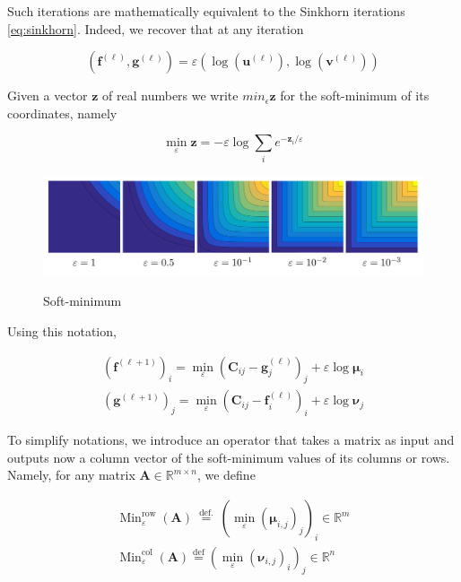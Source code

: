 Such iterations are mathematically equivalent to the Sinkhorn iterations \ref{eq:sinkhorn}. Indeed, we recover that at
any iteration

\begin{equation}
  \left(\mathbf{f}^{(\ell)}, \mathbf{g}^{(\ell)}\right)=\varepsilon\left(\log \left(\mathbf{u}^{(\ell)}\right), \log \left(\mathbf{v}^{(\ell)}\right)\right)
\end{equation}

Given a vector $\mathbf{z}$ of real numbers we write $min_{\epsilon} \mathbf{z}$ for the soft-minimum of its coordinates, namely

\begin{equation}
  \min _{\varepsilon} \mathbf{z}=-\varepsilon \log \sum_{i} e^{-\mathbf{z}_{i} / \varepsilon}
\end{equation}

\begin{figure}[htbp]
  \centering
  \includegraphics[width=0.9\linewidth]{img/min_eps}
  \label{fig:ot}
  \caption{Soft-minimum}
\end{figure}

Using this notation,

\begin{equation}
  \begin{array}{l}
    {\left(\mathbf{f}^{(\ell+1)}\right)_{i}=\min _{\varepsilon}\left(\mathbf{C}_{i j}-\mathbf{g}_{j}^{(\ell)}\right)_{j}+\varepsilon \log \mathbf{\mu}_{i}} \\
    {\left(\mathbf{g}^{(\ell+1)}\right)_{j}=\min _{\varepsilon}\left(\mathbf{C}_{i j}-\mathbf{f}_{i}^{(\ell)}\right)_{i}+\varepsilon \log \mathbf{\nu}_{j}}
    \end{array}
\end{equation}

To simplify notations, we introduce an operator that
takes a matrix as input and outputs now a column vector of the soft-minimum values
of its columns or rows. Namely, for any matrix $\mathbf{A} \in \mathbb{R}^{m \times n}$, we define

\begin{equation}
  \begin{array}{l}
    {\operatorname{Min}_{\varepsilon}^{\mathrm{row}}(\mathbf{A}) \stackrel{\text { def. }}{=}\left(\min _{\varepsilon}\left(\mathbf{\mu}_{i, j}\right)_{j}\right)_{i} \in \mathbb{R}^{m}} \\
    {\operatorname{Min}_{\varepsilon}^{\mathrm{col}}(\mathbf{A}) \stackrel{\mathrm{def}}{=}\left(\min _{\varepsilon}\left(\mathbf{\nu}_{i, j}\right)_{i}\right)_{j} \in \mathbb{R}^{n}}
    \end{array}
\end{equation}

